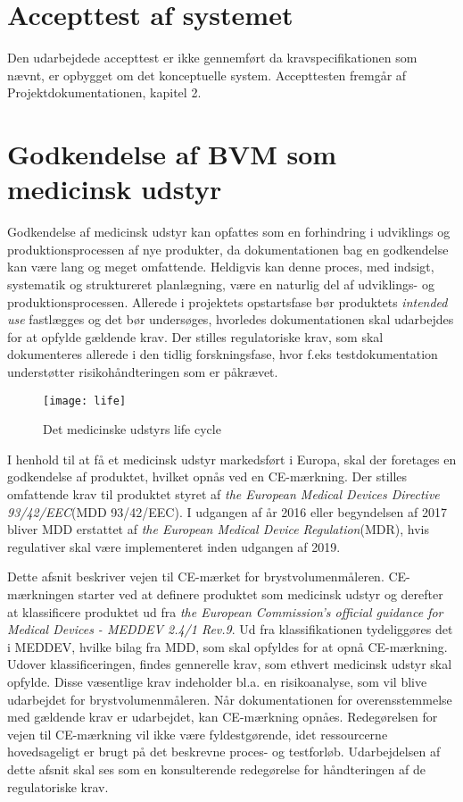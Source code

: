 \section{Accepttest af systemet}
Den udarbejdede accepttest er ikke gennemført da kravspecifikationen som nævnt, er opbygget om det konceptuelle system. Accepttesten fremgår af Projektdokumentationen, kapitel 2. 

\section{Godkendelse af BVM som medicinsk udstyr}
Godkendelse af medicinsk udstyr kan opfattes som en forhindring i udviklings og produktionsprocessen af nye produkter, da dokumentationen bag en godkendelse kan være lang og meget omfattende. Heldigvis kan denne proces, med indsigt, systematik og struktureret planlægning, være en naturlig del af udviklings- og produktionsprocessen. Allerede i projektets opstartsfase bør produktets \textit{intended use} fastlægges og det bør undersøges, hvorledes dokumentationen skal udarbejdes for at opfylde gældende krav.
Der stilles regulatoriske krav, som skal dokumenteres allerede i den tidlig forskningsfase, hvor f.eks testdokumentation understøtter risikohåndteringen som er påkrævet. 

\begin{figure}[htb]
\centering	
\texttt{[image: life]}
\caption{Det medicinske udstyrs life cycle}
\label{fig:label}
\end{figure}

I henhold til at få et medicinsk udstyr markedsført i Europa, skal der foretages en godkendelse af produktet, hvilket opnås ved en CE-mærkning. Der stilles omfattende krav til produktet styret af \textit{the European Medical Devices Directive 93/42/EEC}{}(MDD 93/42/EEC). I udgangen af år 2016 eller begyndelsen af 2017 bliver MDD erstattet af \textit{the European Medical Device Regulation}{}(MDR), hvis regulativer skal være implementeret inden udgangen af 2019. 
  
Dette afsnit beskriver vejen til CE-mærket for brystvolumenmåleren. CE-mærkningen starter ved at definere produktet som medicinsk udstyr og derefter at klassificere produktet ud fra \textit{the European Commission's official guidance for Medical Devices - MEDDEV 2.4/1 Rev.9}. Ud fra klassifikationen tydeliggøres det i MEDDEV, hvilke bilag fra MDD, som skal opfyldes for at opnå CE-mærkning. 
Udover klassificeringen, findes gennerelle krav, som ethvert medicinsk udstyr skal opfylde. Disse væsentlige krav indeholder bl.a. en risikoanalyse, som vil blive udarbejdet for brystvolumenmåleren. 
Når dokumentationen for overensstemmelse med gældende krav er udarbejdet, kan CE-mærkning opnåes.
Redegørelsen for vejen til CE-mærkning vil ikke være fyldestgørende, idet ressourcerne hovedsageligt er brugt på det beskrevne proces- og testforløb. Udarbejdelsen af dette afsnit skal ses som en konsulterende redegørelse for håndteringen af de regulatoriske krav. 

